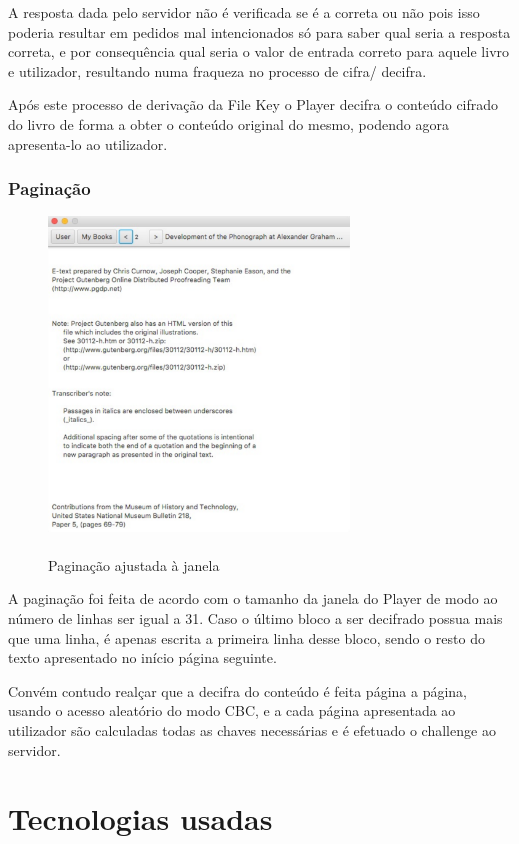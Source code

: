 \documentclass[pdftex,12pt,a4paper]{report}
\begin{document}
A resposta dada pelo servidor não é verificada se é a correta ou não pois isso poderia resultar em pedidos mal intencionados só para saber qual seria a resposta correta, e por consequência qual seria o valor de entrada correto para aquele livro e utilizador, resultando numa fraqueza no processo de cifra/ decifra.

Após este processo de derivação da File Key o Player decifra o conteúdo cifrado do livro de forma a obter o conteúdo original do mesmo, podendo agora apresenta-lo ao utilizador.

\newpage
\subsubsection{Paginação}

\begin{figure}[!htb]
\center
 \includegraphics[width=80mm,scale=1]{Book_page.pdf}
 \caption{\\Paginação ajustada à janela}
 \label{fig:eer}
\end{figure}

A paginação foi feita de acordo com o tamanho da janela do Player de modo ao número de linhas ser igual a 31. Caso o último bloco a ser decifrado possua mais que uma linha, é apenas escrita a primeira linha desse bloco, sendo o resto do texto apresentado no início página seguinte.

Convém contudo realçar que a decifra do conteúdo é feita página a página, usando o acesso aleatório do modo CBC, e  a cada página apresentada ao utilizador são calculadas todas as chaves necessárias e é efetuado o challenge ao servidor.

\section{Tecnologias usadas}
\end{document}
